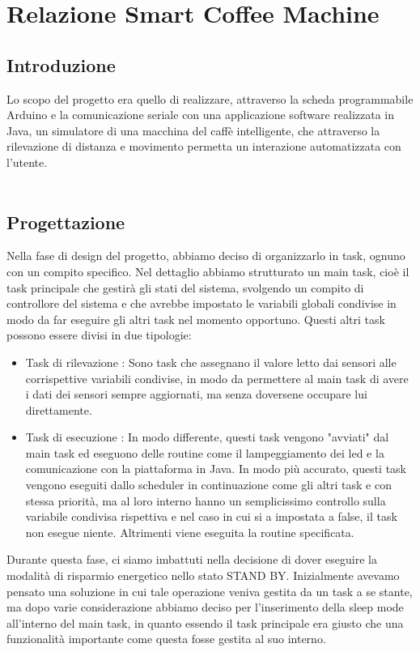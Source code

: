\documentclass[a4paper]{article}
\begin{document}
\section*{Relazione Smart Coffee Machine} 
\subsection*{Introduzione}
Lo scopo del progetto era quello di realizzare, attraverso la scheda programmabile Arduino e la comunicazione seriale con una applicazione software realizzata in Java, un simulatore di una macchina del caffè intelligente, che attraverso la rilevazione di distanza e movimento permetta un interazione automatizzata con l'utente.
\\
\\
\subsection*{Progettazione }
Nella fase di design del progetto, abbiamo deciso di organizzarlo in task, ognuno con un compito specifico. Nel dettaglio abbiamo strutturato un main task, cioè il task principale che gestirà gli stati del sistema, svolgendo un compito di controllore del sistema e che avrebbe impostato le variabili globali condivise in modo da far eseguire gli altri task nel momento opportuno.
Questi altri task possono essere divisi in due tipologie:
\begin{itemize}
\item {Task di rilevazione }:
Sono task che assegnano il valore letto dai sensori alle corrispettive variabili condivise, in modo da permettere al main task di avere i dati dei sensori sempre aggiornati, ma senza doversene occupare lui direttamente.


\item {Task di esecuzione }:
In modo differente, questi task vengono "avviati" dal main task ed eseguono delle routine come il lampeggiamento dei led e la comunicazione con la piattaforma in Java.
In modo più accurato, questi task vengono eseguiti dallo scheduler in continuazione come gli altri task e con stessa priorità, ma al loro interno hanno un semplicissimo controllo sulla variabile condivisa rispettiva e nel caso in cui si
a impostata a false, il task non esegue niente. Altrimenti viene eseguita la routine specificata.

\end{itemize}
Durante questa fase, ci siamo imbattuti nella decisione di dover eseguire la modalità di risparmio energetico nello stato STAND BY. Inizialmente avevamo pensato una soluzione in cui tale operazione veniva gestita da un task a se stante, ma dopo varie considerazione abbiamo deciso per l'inserimento della sleep mode all'interno del main task, in quanto essendo il task principale era giusto che una funzionalità importante come questa fosse gestita al suo interno. 
\end{document}

